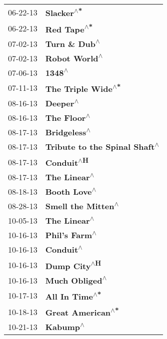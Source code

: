 \begin{supertabular}{p{0.25\columnwidth}p{0.75\columnwidth}}
 06-22-13 &                     \textbf{Slacker\textsuperscript{$\wedge$*}} \\
 06-22-13 &                    \textbf{Red Tape\textsuperscript{$\wedge$*}} \\
 07-02-13 &                  \textbf{Turn \& Dub\textsuperscript{$\wedge$}} \\
 07-02-13 &                  \textbf{Robot World\textsuperscript{$\wedge$}} \\
 07-06-13 &                         \textbf{1348\textsuperscript{$\wedge$}} \\
 07-11-13 &             \textbf{The Triple Wide\textsuperscript{$\wedge$*}} \\
 08-16-13 &                       \textbf{Deeper\textsuperscript{$\wedge$}} \\
 08-16-13 &                    \textbf{The Floor\textsuperscript{$\wedge$}} \\
 08-17-13 &                   \textbf{Bridgeless\textsuperscript{$\wedge$}} \\
 08-17-13 &  \textbf{Tribute to the Spinal Shaft\textsuperscript{$\wedge$}} \\
 08-17-13 &                     \textbf{Conduit\textsuperscript{$\wedge$H}} \\
 08-17-13 &                   \textbf{The Linear\textsuperscript{$\wedge$}} \\
 08-18-13 &                   \textbf{Booth Love\textsuperscript{$\wedge$}} \\
 08-28-13 &             \textbf{Smell the Mitten\textsuperscript{$\wedge$}} \\
 10-05-13 &                   \textbf{The Linear\textsuperscript{$\wedge$}} \\
 10-16-13 &                  \textbf{Phil's Farm\textsuperscript{$\wedge$}} \\
 10-16-13 &                      \textbf{Conduit\textsuperscript{$\wedge$}} \\
 10-16-13 &                   \textbf{Dump City\textsuperscript{$\wedge$H}} \\
 10-16-13 &                 \textbf{Much Obliged\textsuperscript{$\wedge$}} \\
 10-17-13 &                 \textbf{All In Time\textsuperscript{$\wedge$*}} \\
 10-18-13 &              \textbf{Great American\textsuperscript{$\wedge$*}} \\
 10-21-13 &                       \textbf{Kabump\textsuperscript{$\wedge$}} \\

\end{supertabular}
